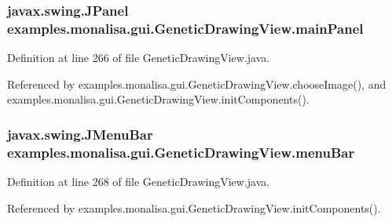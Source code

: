 \hypertarget{classexamples_1_1monalisa_1_1gui_1_1_genetic_drawing_view_a6815608f2495773c4020cf9037dc66c4}{
\subsubsection[{main\-Panel}]{\setlength{\rightskip}{0pt plus 5cm}javax.\-swing.\-J\-Panel examples.\-monalisa.\-gui.\-Genetic\-Drawing\-View.\-main\-Panel\hspace{0.3cm}{\ttfamily [private]}}}\label{classexamples_1_1monalisa_1_1gui_1_1_genetic_drawing_view_a6815608f2495773c4020cf9037dc66c4}


Definition at line 266 of file Genetic\-Drawing\-View.\-java.



Referenced by examples.\-monalisa.\-gui.\-Genetic\-Drawing\-View.\-choose\-Image(), and examples.\-monalisa.\-gui.\-Genetic\-Drawing\-View.\-init\-Components().

\hypertarget{classexamples_1_1monalisa_1_1gui_1_1_genetic_drawing_view_a8e859903eaad4bff7e0828d1059668a4}{
\subsubsection[{menu\-Bar}]{\setlength{\rightskip}{0pt plus 5cm}javax.\-swing.\-J\-Menu\-Bar examples.\-monalisa.\-gui.\-Genetic\-Drawing\-View.\-menu\-Bar\hspace{0.3cm}{\ttfamily [private]}}}\label{classexamples_1_1monalisa_1_1gui_1_1_genetic_drawing_view_a8e859903eaad4bff7e0828d1059668a4}


Definition at line 268 of file Genetic\-Drawing\-View.\-java.



Referenced by examples.\-monalisa.\-gui.\-Genetic\-Drawing\-View.\-init\-Components().

